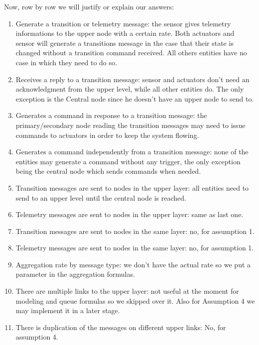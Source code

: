 \documentclass[11pt]{article}
\begin{document}
Now, row by row we will justify or explain our answers:
\begin{enumerate}
\item Generate a transition or telemetry message: the sensor gives telemetry informations to the upper node with a certain rate. Both actuators and sensor will generate a transitions message in the case that their state is changed without a transition command received. All others entities have no case in which they need to do so.
\item Receives a reply to a transition message: sensor and actuators don't need an acknowledgment from the upper level, while all other entities do. The only exception is the Central node since he doesn't have an upper node to send to.
\item Generates a command in response to a transition message: the primary/secondary node reading the transition messages may need to issue commands to actuators in order to keep the system flowing.
\item Generates a command independently from a transition message: none of the entities may generate a command without any trigger, the only exception being the central node which sends commands when needed.
\item Transition messages are sent to nodes in the upper layer: all entities need to send to an upper level until the central node is reached.
\item Telemetry messages are sent to nodes in the upper layer: same as last one.
\item Transition messages are sent to nodes in the same layer: no, for assumption 1.
\item Telemetry messages are sent to nodes in the same layer: no, for assumption 1.
\item Aggregation rate by message type: we don't have the actual rate so we put a parameter in the aggregation formulas.
\item There are multiple links to the upper layer: not useful at the moment for modeling and queue formulas so we skipped over it. Also for Assumption 4 we may implement it in a later stage.
\item There is duplication of the messages on different upper links: No, for assumption 4.
\end{enumerate}
\end{document}
